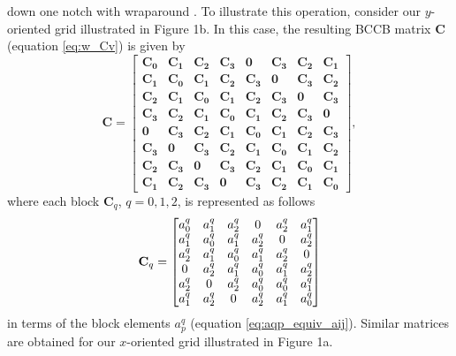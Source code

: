 down one notch with wraparound \citep[][ p. 20]{golub-vanloan2013}.
To illustrate this operation, consider our $y$-oriented grid illustrated in Figure 1b. 
In this case, the resulting 
BCCB matrix $\mathbf{C}$ (equation \ref{eq:w_Cv}) is given by 
\begin{equation}
\mathbf{C} =
\begin{bmatrix}
	\mathbf{C_{0}} & \mathbf{C_{1}} & \mathbf{C_{2}} & \mathbf{C_{3}} & \mathbf{0}     & \mathbf{C_{3}} & \mathbf{C_{2}} & \mathbf{C_{1}} \\
	\mathbf{C_{1}} & \mathbf{C_{0}} & \mathbf{C_{1}} & \mathbf{C_{2}} & \mathbf{C_{3}} & \mathbf{0}     & \mathbf{C_{3}} & \mathbf{C_{2}} \\
	\mathbf{C_{2}} & \mathbf{C_{1}} & \mathbf{C_{0}} & \mathbf{C_{1}} & \mathbf{C_{2}} & \mathbf{C_{3}} & \mathbf{0}     & \mathbf{C_{3}} \\
	\mathbf{C_{3}} & \mathbf{C_{2}} & \mathbf{C_{1}} & \mathbf{C_{0}} & \mathbf{C_{1}} & \mathbf{C_{2}} & \mathbf{C_{3}} & \mathbf{0}     \\
	\mathbf{0}     & \mathbf{C_{3}} & \mathbf{C_{2}} & \mathbf{C_{1}} & \mathbf{C_{0}} & \mathbf{C_{1}} & \mathbf{C_{2}} & \mathbf{C_{3}} \\
	\mathbf{C_{3}} & \mathbf{0}     & \mathbf{C_{3}} & \mathbf{C_{2}} & \mathbf{C_{1}} & \mathbf{C_{0}} & \mathbf{C_{1}} & \mathbf{C_{2}} \\
	\mathbf{C_{2}} & \mathbf{C_{3}} & \mathbf{0}     & \mathbf{C_{3}} & \mathbf{C_{2}} & \mathbf{C_{1}} & \mathbf{C_{0}} & \mathbf{C_{1}} \\
	\mathbf{C_{1}} & \mathbf{C_{2}} & \mathbf{C_{3}} & \mathbf{0}     & \mathbf{C_{3}} & \mathbf{C_{2}} & \mathbf{C_{1}} & \mathbf{C_{0}}
\end{bmatrix},
\label{eq:C-y-oriented}
\end{equation}
where each block $\mathbf{C}_{q}$, $q = 0, 1, 2$, is represented as follows 
\begin{equation}
\tensor{C}_{q} =
\begin{bmatrix}
	a^{q}_{0} & a^{q}_{1} & a^{q}_{2} & 0         & a^{q}_{2} & a^{q}_{1} \\
	a^{q}_{1} & a^{q}_{0} & a^{q}_{1} & a^{q}_{2} & 0         & a^{q}_{2} \\
	a^{q}_{2} & a^{q}_{1} & a^{q}_{0} & a^{q}_{1} & a^{q}_{2} & 0         \\
	0         & a^{q}_{2} & a^{q}_{1} & a^{q}_{0} & a^{q}_{1} & a^{q}_{2} \\
	a^{q}_{2} & 0         & a^{q}_{2} & a^{q}_{0} & a^{q}_{0} & a^{q}_{1} \\
	a^{q}_{1} & a^{q}_{2} & 0         & a^{q}_{2} & a^{q}_{1} & a^{q}_{0}
\end{bmatrix}
\label{eq:Cq-y-oriented}
\end{equation}
in terms of the block elements $a^{q}_{p}$ (equation \ref{eq:aqp_equiv_aij}).
Similar matrices are obtained for our $x$-oriented grid illustrated in Figure 1a.

